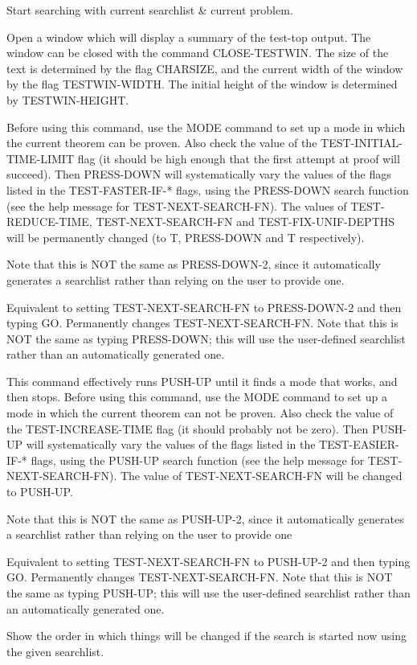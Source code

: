 \begin{description}
\item[GO]  
Start searching with current searchlist \&  current problem.

\item[OPEN-TESTWIN]  
Open a window which will display a summary of the test-top output.
The window can be closed with the command CLOSE-TESTWIN. The size 
of the text is determined by the flag CHARSIZE, and the current width of the window 
by the flag TESTWIN-WIDTH. The initial height of the window is determined by 
TESTWIN-HEIGHT.

\item[PRESS-DOWN]  
Before using this command, use the MODE command to 
set up a mode in which the current theorem can be proven. Also
check the value of the TEST-INITIAL-TIME-LIMIT flag (it should
be high enough that the first attempt at proof will succeed).
Then PRESS-DOWN will systematically vary the values of the flags
listed in the TEST-FASTER-IF-* flags, using the PRESS-DOWN search
function (see the help message for TEST-NEXT-SEARCH-FN).
The values of TEST-REDUCE-TIME, TEST-NEXT-SEARCH-FN and 
TEST-FIX-UNIF-DEPTHS will be permanently changed (to T, PRESS-DOWN
and T respectively).

Note that this is NOT the same as PRESS-DOWN-2, since it automatically
generates a searchlist rather than relying on the user to provide one.

\item[PRESS-DOWN-2]  
Equivalent to setting TEST-NEXT-SEARCH-FN to PRESS-DOWN-2
and then typing GO. Permanently changes TEST-NEXT-SEARCH-FN.
Note that this is NOT the same as typing PRESS-DOWN; this will
use the user-defined searchlist rather than an automatically
generated one.

\item[PUSH-UP]  
This command effectively runs PUSH-UP until it finds
a mode that works, and then stops.
Before using this command, use the MODE command to 
set up a mode in which the current theorem can not be proven. Also
check the value of the TEST-INCREASE-TIME flag (it should probably
not be zero).
Then PUSH-UP will systematically vary the values of the flags
listed in the TEST-EASIER-IF-* flags, using the PUSH-UP search
function (see the help message for TEST-NEXT-SEARCH-FN).
The value of TEST-NEXT-SEARCH-FN will be changed to PUSH-UP.

Note that this is NOT the same as PUSH-UP-2, since it automatically
generates a searchlist rather than relying on the user to provide one

\item[PUSH-UP-2]  
Equivalent to setting TEST-NEXT-SEARCH-FN to PUSH-UP-2
and then typing GO. Permanently changes TEST-NEXT-SEARCH-FN.
Note that this is NOT the same as typing PUSH-UP; this will
use the user-defined searchlist rather than an automatically
generated one.

\item[SEARCH-ORDER]  
Show the order in which things will be changed if the search is
started now using the given searchlist.
\item
\end{description}

